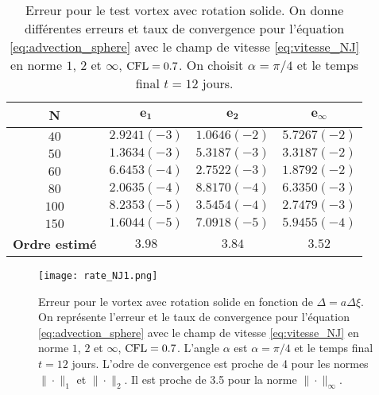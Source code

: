 \begin{table}[htbp]
\begin{center}
\begin{tabular}{|c||c|c|c|}
\hline
\textbf{N}  & $\mathbf{e_1}$ & $\mathbf{e_2}$ & $\mathbf{e_{\infty}}$\\
\hline
\hline
$40$  & $2.9241 (-3)$ & $1.0646 (-2)$ & $5.7267 (-2)$ \\
$50$  & $1.3634 (-3)$ & $5.3187 (-3)$ & $3.3187 (-2)$ \\
$60$  & $6.6453 (-4)$ & $2.7522 (-3)$ & $1.8792 (-2)$ \\
$80$  & $2.0635 (-4)$ & $8.8170 (-4)$ & $6.3350 (-3)$ \\
$100$ & $8.2353 (-5)$ & $3.5454 (-4)$ & $2.7479 (-3)$ \\
$150$ & $1.6044 (-5)$ & $7.0918 (-5)$ & $5.9455 (-4)$ \\
\hline 
\hline
\textbf{Ordre estimé}& $3.98$ & $3.84$ & $3.52$\\
\hline
\end{tabular}
\end{center}
\caption{Erreur pour le test vortex avec rotation solide. On donne différentes erreurs et taux de convergence pour l'équation \eqref{eq:advection_sphere} avec le champ de vitesse \eqref{eq:vitesse_NJ} en norme $1$, $2$ et $\infty$, $\text{CFL} = 0.7$. On choisit $\alpha = \pi/4$ et le temps final $t=12$ jours.}
\label{tab:rate1_NJ}
\end{table} 

\begin{figure}[htbp]
\begin{center}
\texttt{[image: rate\_NJ1.png]}
\end{center}
\caption{Erreur pour le vortex avec rotation solide en fonction de $\Delta = a \Delta \xi$. On représente l'erreur et le taux de convergence pour l'équation \eqref{eq:advection_sphere} avec le champ de vitesse \eqref{eq:vitesse_NJ} en norme $1$, $2$ et $\infty$, $\text{CFL} = 0.7$. L'angle $\alpha$ est $\alpha = \pi/4$ et le temps final $t=12$ jours. L'odre de convergence est proche de 4 pour les normes $\| \cdot \|_1$ et $\| \cdot \|_2$. Il est proche de 3.5 pour la norme $\| \cdot \|_{\infty}$.}
\label{fig:rate1_NJ}
\end{figure} 

